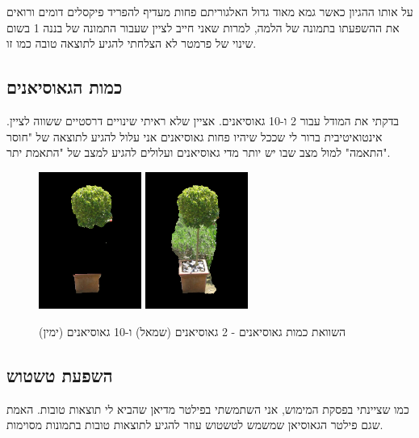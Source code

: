 \documentclass[a4paper,12pt]{article}
\begin{document}
על אותו ההגיון כאשר גמא מאוד גדול האלגוריתם פחות מעדיף להפריד פיקסלים דומים ורואים את ההשפעתו בתמונה של הלמה, למרות שאני חייב לציין שעבור התמונה של בננה 1 בשום שינוי של פרמטר לא הצלחתי להגיע לתוצאה טובה כמו זו.


\subsection{כמות הגאוסיאנים}
בדקתי את המודל עבור 2 ו-10 גאוסיאנים. אציין שלא ראיתי שינויים דרסטיים ששווה לציין. אינטואיטיבית ברור לי שככל שיהיו פחות גאוסיאנים אני עלול להגיע לתוצאה של "חוסר התאמה" למול מצב שבו יש יותר מדי גאוסיאנים ועלולים להגיע למצב של "התאמת יתר".

\begin{figure}[H]
    \centering
    \includegraphics[width=0.3\textwidth]{my_reasults/comp2/bush_result.png}
    \includegraphics[width=0.3\textwidth]{my_reasults/comp10/bush_result.png}
    \caption{השוואת כמות גאוסיאנים - 2 גאוסיאנים (שמאל) ו-10 גאוסיאנים (ימין)}
\end{figure}
\subsection{השפעת טשטוש}
כמו שציינתי בפסקת המימוש, אני השתמשתי בפילטר מדיאן שהביא לי תוצאות טובות. האמת שגם פילטר הגאוסיאן שמשמש לטשטוש עוזר להגיע לתוצאות טובות בתמונות מסוימות.
\end{document}
